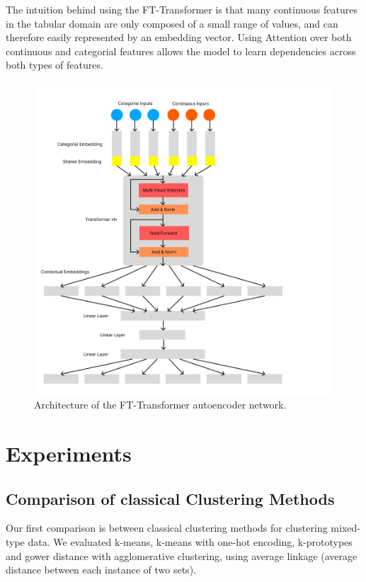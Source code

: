 The intuition behind using the FT-Transformer is that many continuous features in the tabular domain are only composed of a small range of values, and can therefore easily represented by an embedding vector. Using Attention over both continuous and categorial features allows the model to learn dependencies across both types of features.

\begin{figure}
\centering
	\includegraphics[width=1.2\linewidth]{ft_transformer_autoencoder.png}
	\caption{Architecture of the FT-Transformer autoencoder network.}
	\label{ft_transformer_autoencoder}
\end{figure}

\chapter{Experiments} \label{Experiments}

\section{Comparison of classical Clustering Methods}

Our first comparison is between classical clustering methods for clustering mixed-type data. We evaluated k-means, k-means with one-hot encoding, k-prototypes and gower distance with agglomerative clustering, using average linkage (average distance between each instance of two sets).

